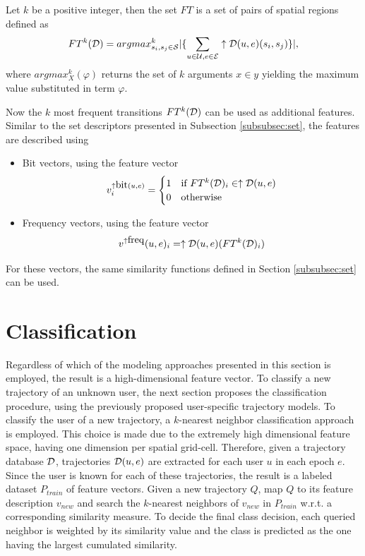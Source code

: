 \begin{definition}
Let $k$ be a positive integer, then the set $FT$ is a set of pairs of spatial regions defined as
$$
FT^k(\mathcal{D})=argmax^k_{s_i,s_j\in \mathcal{S}} |\{\sum_{u\in\mathcal{U},e\in\mathcal{E}}\uparrow\mathcal{D}(u,e)(s_i,s_j)\}|,
$$
where $argmax^k_X(\varphi)$ returns the set of $k$ arguments $x\in y$ yielding the maximum value substituted in term $\varphi$.
\end{definition}
Now the $k$ most frequent transitions $FT^k(\mathcal{D})$ can be used as additional features.
Similar to the set descriptors presented in Subsection \ref{subsubsec:set}, the features are described using
\begin{itemize}
\item Bit vectors, using the feature vector
$$
v^{\uparrow\mbox{bit}(u,e)}_i=\begin{cases}1 & \text{if }FT^k(\mathcal{D})_i\in \uparrow\mathcal{D}(u,e) \\ 0 & \text{otherwise}\end{cases}
$$
\item Frequency vectors, using the feature vector
$$
v^{\uparrow\mbox{freq}}(u,e)_i=\uparrow\mathcal{D}(u,e)(FT^k(\mathcal{D})_i)
$$

\end{itemize}
For these vectors, the same similarity functions defined in Section \ref{subsubsec:set} can be used.

\section{Classification}\label{subsec:class}
Regardless of which of the modeling approaches presented in this section is employed, the result is a high-dimensional feature vector. To classify a new trajectory of an unknown user, the next section proposes the classification procedure, using the previously proposed user-specific trajectory models. To classify the user of a new trajectory, a $k$-nearest neighbor classification approach is employed. This choice is made due to the extremely high dimensional feature space, having one dimension per spatial grid-cell.
Therefore, given a trajectory database $\mathcal{D}$, trajectories $\mathcal{D}(u,e)$ are extracted for each user $u$ in each epoch $e$. Since the user is known for each of these trajectories, the result is a labeled dataset $P_{train}$ of feature vectors. Given a new trajectory $Q$, map $Q$ to its feature description $v_{new}$ and search the $k$-nearest neighbors of $v_{new}$ in $P_{train}$ w.r.t. a corresponding similarity measure. To decide the final class decision, each queried neighbor is weighted by its similarity value and the class is predicted as the one having the largest cumulated similarity.

